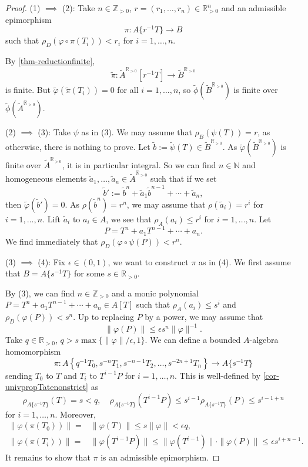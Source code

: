 \begin{proof}
    (1) $\implies$ (2): Take $n\in \mathbb{Z}_{>0}$, $r=(r_1,\ldots,r_n)\in \mathbb{R}^n_{>0}$ and an admissible epimorphism
    \[
        \pi: A\{r^{-1}T\}\rightarrow B    
    \] 
    such that $\rho_D(\varphi\circ \pi(T_i))<r_i$ for $i=1,\ldots,n$.

    By \cref{thm-reductionfinite}, 
    \[
        \tilde{\pi}:\tilde{A}^{\mathbb{R}_{>0}}[r^{-1}T]\rightarrow \tilde{B}^{\mathbb{R}_{>0}}
    \]
    is finite. But $\tilde{\varphi}(\tilde{\pi}(T_i))=0$ for all $i=1,\ldots,n$, so $\tilde{\phi}(\tilde{B}^{\mathbb{R}_{>0}})$ is finite over $\tilde{\phi}(\tilde{A}^{\mathbb{R}_{>0}})$.

    (2) $\implies$ (3): Take $\psi$ as in (3). We may assume that $\rho_B(\psi(T))=r$, as otherwise, there is nothing to prove.
    Let $\tilde{b}:=\tilde{\psi}(T)\in \tilde{B}^{\mathbb{R}_{>0}}$. As $\tilde{\varphi}(\tilde{B}^{\mathbb{R}_{>0}})$ is finite over $\tilde{A}^{\mathbb{R}_{>0}}$, it is in particular integral. So we can find $n\in \mathbb{N}$ and  homogeneous elements $\tilde{a}_1,\ldots,\tilde{a}_n\in \tilde{A}^{\mathbb{R}_{>0}}$ such that if we set
    \[
        \tilde{b}':=\tilde{b}^n+\tilde{a}_{1}\tilde{b}^{n-1}+\cdots+ \tilde{a}_n,
    \]
    then $\tilde{\varphi}(\tilde{b}')=0$. As $\rho(\tilde{b}^n)=r^n$, we may assume that $\rho(\tilde{a}_i)=r^i$ for $i=1,\ldots,n$. Lift $\tilde{a}_i$ to $a_i\in A$, we see that $\rho_A(a_i)\leq r^i$ for $i=1,\ldots,n$. Let
    \[
        P=T^n+a_1T^{n-1}+\cdots+a_n.
    \]
    We find immediately that $\rho_D(\varphi\circ \psi(P))<r^n$.

    (3) $\implies$ (4): Fix $\epsilon\in (0,1)$, we want to construct $\pi$ as in (4).
    We first assume that $B=A\{s^{-1}T\}$ for some $s\in \mathbb{R}_{>0}$.

    By (3), we can find $n\in \mathbb{Z}_{>0}$ and a monic polynomial $P=T^n+a_1T^{n-1}+\cdots+a_n\in A[T]$ such that $\rho_A(a_i)\leq s^i$ and $\rho_D(\varphi(P))<s^n$. Up to replacing $P$ by a power, we may assume that 
    \[
        \|\varphi(P)\|\leq \epsilon s^n\|\varphi\|^{-1}.  
    \]
    Take $q\in \mathbb{R}_{>0}$, $q>s\max\{\|\varphi\|/\epsilon,1\}$. We can define a bounded $A$-algebra homomorphism
    \[
        \pi:A\left\{q^{-1}T_0,s^{-n}T_1,s^{-n-1}T_2,\ldots, s^{-2n+1}T_n \right\}\rightarrow A\{s^{-1}T\}  
    \]
    sending $T_0$ to $T$ and $T_i$ to $T^{i-1}P$ for $i=1,\ldots,n$. This is well-defined by \cref{cor-univpropTatenonstrict} as
    \[
        \rho_{A\{s^{-1}T\}}(T)=s<q, \quad \rho_{A\{s^{-1}T\}}(T^{i-1}P)\leq s^{i-1}\rho_{A\{s^{-1}T\}}(P)\leq s^{i-1+n}  
    \]
    for $i=1,\ldots,n$. Moreover,
    \[
        \begin{aligned}
        \|\varphi(\pi(T_0))\| = &\|\varphi(T)\|\leq s\|\varphi\|<\epsilon q,\\
        \|\varphi(\pi(T_i))\| = & \|\varphi(T^{i-1}P)\|\leq \|\varphi(T^{i-1})\|\cdot \|\varphi(P)\|\leq \epsilon s^{i+n-1}.
        \end{aligned}
    \]
    It remains to show that $\pi$ is an admissible epimorphism. 


\end{proof}
